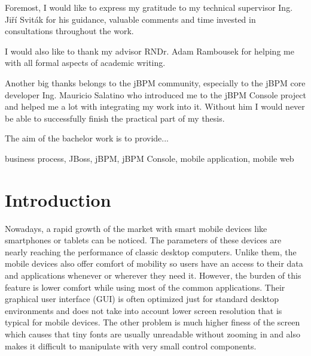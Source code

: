 \documentclass[12pt,oneside,final]{fithesis2}
\begin{document}
\FrontMatter
\ThesisTitlePage

\begin{ThesisDeclaration}
\DeclarationText
\AdvisorName
\end{ThesisDeclaration}

\begin{ThesisThanks}
Foremost, I would like to express my gratitude to my technical supervisor Ing. Jiří Sviták for his guidance, valuable comments and time invested in consultations throughout the work.

I would also like to thank my advisor RNDr. Adam Rambousek for helping me with all formal aspects of academic writing.

Another big thanks belongs to the jBPM community, especially to the jBPM core developer Ing. Mauricio Salatino who introduced me to the jBPM Console project and helped me a lot with integrating my work into it.
Without him I would never be able to successfully finish the practical part of my thesis.
\end{ThesisThanks}

\begin{ThesisAbstract}
The aim of the bachelor work is to provide...
\end{ThesisAbstract}

\begin{ThesisKeyWords}
business process, JBoss, jBPM, jBPM Console, mobile application, mobile web
\end{ThesisKeyWords}

\tableofcontents

\MainMatter
\chapter{Introduction}
Nowadays, a rapid growth of the market with smart mobile devices like smartphones or tablets can be noticed.
The parameters of these devices are nearly reaching the performance of classic desktop computers.
Unlike them, the mobile devices also offer comfort of mobility so users have an access to their data and applications whenever or wherever they need it.
However, the burden of this feature is lower comfort while using most of the common applications.
Their graphical user interface (GUI) is often optimized just for standard desktop environments and does not take into account lower screen resolution that is typical for mobile devices.
The other problem is much higher finess of the screen which causes that tiny fonts are usually unreadable without zooming in and also makes it difficult to manipulate with very small control components.
\end{document}
